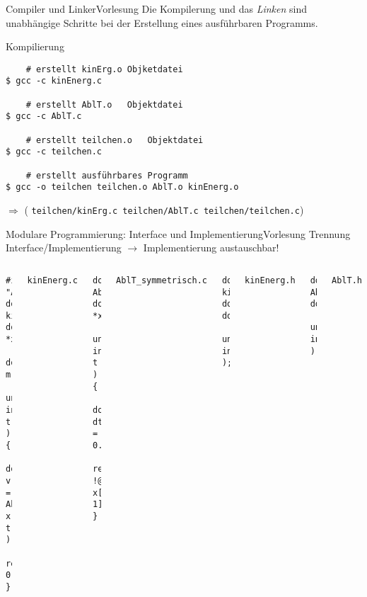 \documentclass[xcolor=dvipsnames]{beamer}
\newcounter{lecturecounter}
\begin{document}
\begin{frame}[fragile]{Compiler und Linker}{Vorlesung }
  Die Kompilerung und das \emph{Linken} sind unabhängige Schritte bei der Erstellung eines ausführbaren Programms.
\begin{block}{Kompilierung}
  \begin{verbatim}
    # erstellt kinErg.o Objketdatei
$ gcc -c kinEnerg.c

    # erstellt AblT.o   Objektdatei
$ gcc -c AblT.c       

    # erstellt teilchen.o   Objektdatei
$ gcc -c teilchen.c       

    # erstellt ausführbares Programm
$ gcc -o teilchen teilchen.o AblT.o kinEnerg.o 
  \end{verbatim}
\end{block}
$\Rightarrow$ ( \verb|teilchen/kinErg.c teilchen/AblT.c teilchen/teilchen.c|)
\end{frame}

\begin{frame}[fragile]{Modulare Programmierung: Interface und Implementierung}{Vorlesung }
Trennung Interface/Implementierung $\rightarrow$ Implementierung austauschbar!
\begin{columns}[T]
    \begin{lstlisting}
#include "AblT.h"
double 
kinEnerg( double *x, 
          double m, 
          unsigned int t ) {
  double v = AblT( x, t );
  return 0.5*m*v*v;
}
    \end{lstlisting}
    \texttt{kinEnerg.c}
    \vspace{0.1cm}
    \begin{lstlisting}
double AblT( double *x, 
             unsigned int t ){
  double dt = 0.01;
  return !@(x[t+1]-x[t-1])/(2*dt)!@;
}
    \end{lstlisting}
    \texttt{AblT\_symmetrisch.c}
    \begin{lstlisting}
double kinEnerg( double*, double,
                 unsigned int );
    \end{lstlisting}
    \texttt{kinEnerg.h}
    \vspace{2.4cm}
    \begin{lstlisting}
double AblT( double*, 
             unsigned int );
    \end{lstlisting}
    \texttt{AblT.h}  
  \end{columns}
\end{frame}
\end{document}
